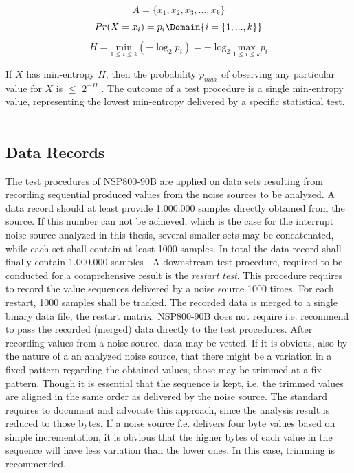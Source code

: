 \begin{equation}
A = \{x_1, x_2, x_3, ..., x_k\}
\label{eq:min-ent-A}
\end{equation}
\begin{equation}
Pr(X=x_i) = p_i 
\Domain{i=\{1,...,k\}}
\end{equation}
\begin{equation}
H = \underset{1\leq i\leq k}{\mathrm{min}}(-\log_2p_i) = -\log_2 \underset{1\leq i\leq k}{\mathrm{max}}p_i
\end{equation}

If $X$ has min-entropy $H$, then the probability $p_{max}$ of observing any particular value for $X$ is $\le$ $2^{-H}$ \cite{turan2018nist}. The outcome of a test procedure is a single min-entropy value, representing the lowest min-entropy delivered by a specific statistical test.
_{
\subsection{Data Records}\label{sub:data-records}}
The test procedures of NSP800-90B are applied on data sets resulting from recording sequential produced values from the noise sources to be analyzed. A data record should at least provide 1.000.000 samples directly obtained from the source. If this number can not be achieved, which is the case for the interrupt noise source analyzed in this thesis, several smaller sets may be concatenated, while each set shall contain at least 1000 samples. In total the data record shall finally contain 1.000.000 samples \cite{turan2018nist}. A downstream test procedure, required to be conducted for a comprehensive result is the \textit{restart test}. This procedure requires to record the value sequences delivered by a noise source 1000 times. For each restart, 1000 samples shall be tracked. The recorded data is merged to a single binary data file, the restart matrix. 
NSP800-90B does not require i.e. recommend to pass the recorded (merged) data directly to the test procedures. After recording values from a noise source, data may be vetted. If it is obvious, also by the nature of a an analyzed noise source, that there might be a variation in a fixed pattern regarding the obtained values, those may be trimmed at a fix pattern. Though it is essential that the sequence is kept, i.e. the trimmed values are aligned in the same order as delivered by the noise source. The standard requires to document and advocate this approach, since the analysis result is reduced to those bytes. If a noise source f.e. delivers four byte values based on simple incrementation, it is obvious that the higher bytes of each value in the sequence will have less variation than the lower ones. In this case, trimming is recommended.

